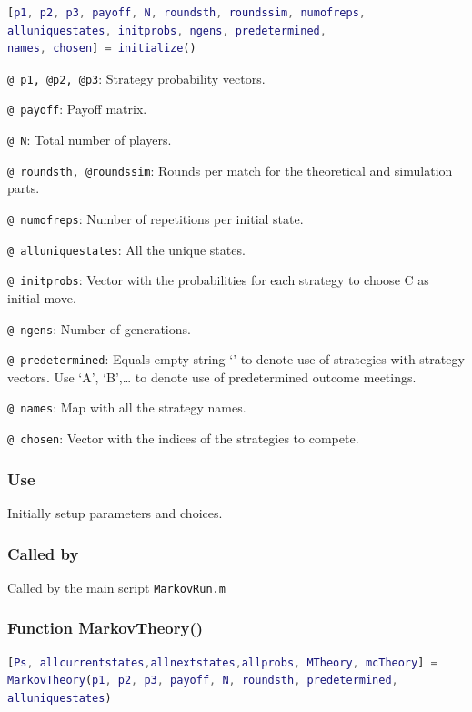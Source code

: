 \documentclass[12pt]{report}
\begin{document}
\begin{lstlisting}[language=Matlab]
[p1, p2, p3, payoff, N, roundsth, roundssim, numofreps, 
alluniquestates, initprobs, ngens, predetermined,
names, chosen] = initialize()

\end{lstlisting}

\texttt{@ p1, @p2, @p3}: Strategy probability vectors.

\texttt{@ payoff}: Payoff matrix.

\texttt{@ N}: Total number of players.

\texttt{@ roundsth, @roundssim}: Rounds per match for the theoretical and simulation parts.

\texttt{@ numofreps}: Number of repetitions per initial state.

\texttt{@ alluniquestates}: All the unique states.

\texttt{@ initprobs}: Vector with the probabilities for each strategy to choose C as  initial move.

\texttt{@ ngens}: Number of generations.

\texttt{@ predetermined}: Equals empty string ‘’ to denote use of strategies with strategy vectors. Use ‘A’, ‘B',… to denote use of predetermined outcome meetings.

\texttt{@ names}: Map with all the strategy names.

\texttt{@ chosen}: Vector with the indices of the strategies to compete.

\subsubsection*{Use}
Initially setup parameters and choices.

\subsubsection*{Called by}
Called by the main script \texttt{MarkovRun.m}








\subsubsection*{Function MarkovTheory()}

\begin{lstlisting}[language=Matlab]
[Ps, allcurrentstates,allnextstates,allprobs, MTheory, mcTheory] =
MarkovTheory(p1, p2, p3, payoff, N, roundsth, predetermined,
alluniquestates)

\end{lstlisting}
\end{document}
